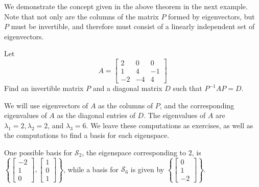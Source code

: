 \documentclass{ximera}
\begin{document}
We demonstrate the concept given in the above theorem in the next example. Note that not only
are the columns of the matrix $P$ formed by eigenvectors, but $P$ must
be invertible, and therefore must consist of a linearly independent set of eigenvectors. 

\begin{example}\label{ex:diagonalizematrix}
Let
\begin{equation*}
A=\begin{bmatrix}
2 & 0 & 0 \\
1 & 4 & -1 \\
-2 & -4 & 4
\end{bmatrix}
\end{equation*}
 Find an invertible matrix $P$ and a diagonal matrix $D$ such that $P^{-1}AP=D$.

\begin{explanation}
We will use eigenvectors of $A$ as the columns of $P$, and
the corresponding eigenvalues of $A$ as the diagonal entries of $D$. The eigenvalues of $A$ are $\lambda_1 =2,\lambda_2 = 2$, and $\lambda_3 = 6$.   We leave these computations as exercises, as well as the computations to find a basis for each eigenspace.  

One possible basis for $\mathcal{S}_2$, the eigenspace corresponding to $2$, is 
$\left\{
\begin{bmatrix}
-2 \\
1 \\
0
\end{bmatrix},
\begin{bmatrix}
1 \\
0 \\
1
\end{bmatrix}
\right\}$, 
while a basis for $\mathcal{S}_6$ is given by 
$\left\{\begin{bmatrix}
0 \\
1 \\
-2
\end{bmatrix}\right\}$.


\end{explanation}
\end{example}
\end{document}
